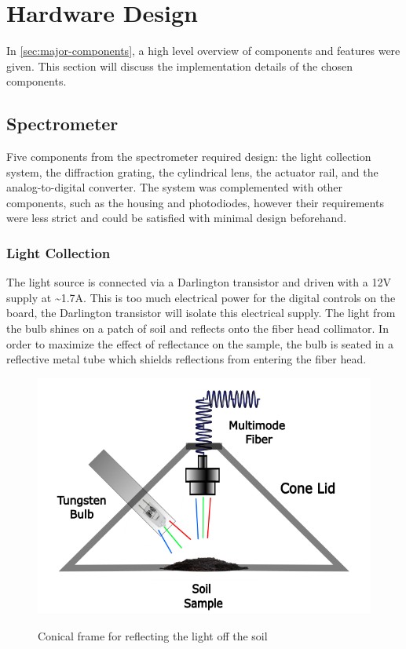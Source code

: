 \documentclass[journal]{IEEEtran}
\begin{document}
\section{Hardware Design}
In \autoref{sec:major-components}, a high level overview of components and features were given. This section will discuss the implementation details of the chosen components.
\subsection{Spectrometer}
Five components from the spectrometer required design: the light collection system, the diffraction grating, the cylindrical lens, the actuator rail, and the analog-to-digital converter. The system was complemented with other components, such as the housing and photodiodes, however their requirements were less strict and could be satisfied with minimal design beforehand. 
\subsubsection{Light Collection}
The light source is connected via a Darlington transistor and driven with a 12V supply at \~{}1.7A. This is too much electrical power for the digital controls on the board, the Darlington transistor will isolate this electrical supply. The light from the bulb shines on a patch of soil and reflects onto the fiber head collimator. In order to maximize the effect of reflectance on the sample, the bulb is seated in a reflective metal tube which shields reflections from entering the fiber head.
\begin{figure}[H]
    \centering
    \includegraphics[width=\linewidth]{images/Light Collection.png}
    \label{fig:Light-Collection-Diagram}
    \caption{Conical frame for reflecting the light off the soil}
\end{figure}
\end{document}
